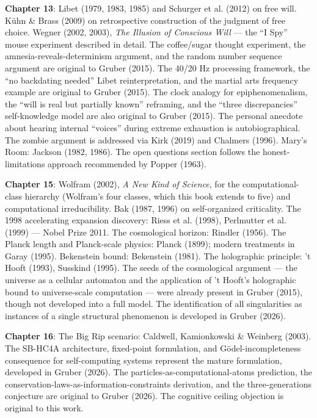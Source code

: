 \documentclass[11pt, twoside, openright]{book}
\begin{document}
\textbf{Chapter 13}: Libet (1979, 1983, 1985) and Schurger et al. (2012) on free will. Kühn \& Brass (2009) on retrospective construction of the judgment of free choice. Wegner (2002, 2003), \textit{The Illusion of Conscious Will} --- the ``I Spy'' mouse experiment described in detail. The coffee/\allowbreak{}sugar thought experiment, the amnesia-reveals-determinism argument, and the random number sequence argument are original to Gruber (2015). The 40/\allowbreak{}20 Hz processing framework, the ``no backdating needed'' Libet reinterpretation, and the martial arts frequency example are original to Gruber (2015). The clock analogy for epiphenomenalism, the ``will is real but partially known'' reframing, and the ``three discrepancies'' self-knowledge model are also original to Gruber (2015). The personal anecdote about hearing internal ``voices'' during extreme exhaustion is autobiographical. The zombie argument is addressed via Kirk (2019) and Chalmers (1996). Mary's Room: Jackson (1982, 1986). The open questions section follows the honest-limitations approach recommended by Popper (1963).

\textbf{Chapter 15}: Wolfram (2002), \textit{A New Kind of Science}, for the computational-class hierarchy (Wolfram's four classes, which this book extends to five) and computational irreducibility. Bak (1987, 1996) on self-organized criticality. The 1998 accelerating expansion discovery: Riess et al. (1998), Perlmutter et al. (1999) --- Nobel Prize 2011. The cosmological horizon: Rindler (1956). The Planck length and Planck-scale physics: Planck (1899); modern treatments in Garay (1995). Bekenstein bound: Bekenstein (1981). The holographic principle: 't Hooft (1993), Susskind (1995). The seeds of the cosmological argument --- the universe as a cellular automaton and the application of 't Hooft's holographic bound to universe-scale computation --- were already present in Gruber (2015), though not developed into a full model. The identification of all singularities as instances of a single structural phenomenon is developed in Gruber (2026).

\textbf{Chapter 16}: The Big Rip scenario: Caldwell, Kamionkowski \& Weinberg (2003). The SB-HC4A architecture, fixed-point formulation, and Gödel-incompleteness consequence for self-computing systems represent the mature formulation, developed in Gruber (2026). The particles-as-computational-atoms prediction, the conservation-laws-as-information-constraints derivation, and the three-generations conjecture are original to Gruber (2026). The cognitive ceiling objection is original to this work.
\end{document}
